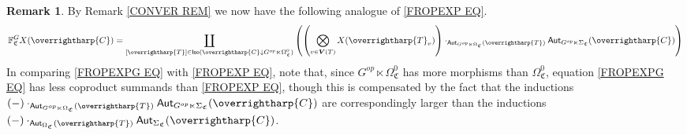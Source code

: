 \documentclass[a4paper,10pt
,draft
]{article}%
\numberwithin{equation}{section}
\numberwithin{figure}{section}
\theoremstyle{definition} %
\newtheorem{remark}[equation]{Remark}%
\newcommand{\vect}[1]{\text{\overrightharp{\ensuremath{#1}}}}
\newcommand{\1}{\ensuremath{\mathbbm 1}}%
\begin{document}
\begin{remark}\label{FROPEXPG REM}
	By Remark \ref{CONVER REM} we now have the following analogue of
	\eqref{FROPEXP EQ}.
	\begin{equation}\label{FROPEXPG EQ}
	\mathbb{F}^G_{\mathfrak{C}} X (\vect{C})
	=
	\coprod_{[\vect{T}] \in 
		\mathsf{Iso}(\vect{C} \downarrow G^{op} \ltimes \Omega^0_{\mathfrak{C}})}
	\left(
	\left(
	\bigotimes_{v \in \boldsymbol{V}(T)} X(\vect{T}_v)
	\right)
	\cdot_{\mathsf{Aut}_{G^{op} \ltimes \Omega_{\mathfrak{C}}}(\vect{T})}
	\mathsf{Aut}_{G^{op} \ltimes \Sigma_{\mathfrak{C}}}(\vect{C})
	\right)
	\end{equation}
	In comparing \eqref{FROPEXPG EQ} with \eqref{FROPEXP EQ},
	note that,
	since $G^{op} \ltimes \Omega^0_{\mathfrak{C}}$
	has more morphisms than
	$\Omega^0_{\mathfrak{C}}$,
	equation \eqref{FROPEXPG EQ} has less coproduct summands than \eqref{FROPEXP EQ},
	though this is compensated by the fact that the inductions
	$(-)\cdot_{\mathsf{Aut}_{G^{op} \ltimes \Omega_{\mathfrak{C}}}(\vect{T})}
	\mathsf{Aut}_{G^{op} \ltimes \Sigma_{\mathfrak{C}}}(\vect{C})$
	are correspondingly larger than the inductions
	$(-)\cdot_{\mathsf{Aut}_{\Omega_{\mathfrak{C}}}(\vect{T})}
	\mathsf{Aut}_{\Sigma_{\mathfrak{C}}}(\vect{C})$.
\end{remark}
\end{document}
